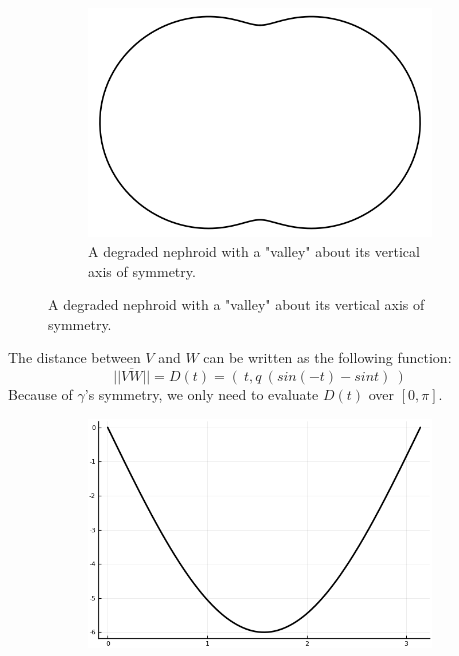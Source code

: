 \documentclass[12pt]{article}
\begin{document}
\begin{figure}[h!]
  \centering
      \begin{subfigure}[b]{0.5\linewidth}
    \includegraphics[width=\linewidth]{./assets/3-3-1/nephroid-degraded.png}
    \caption*{A degraded nephroid with a "valley" about its vertical axis of symmetry.}
  \end{subfigure}
  \end{figure}

\clearpage
The distance between $V$ and $W$ can be written as the following function:\\
$$
||\overline{VW}|| = D(t) = ( \ t, q \ (sin(-t) - sint) \ )
$$
Because of $\gamma$'s symmetry, we only need to evaluate $D(t)$ over $[0, \pi]$.
\begin{figure}[h!]
  \centering
      \begin{subfigure}[b]{0.7\linewidth}
    \includegraphics[width=\linewidth]{./assets/3-3-1/ellipse-chord-distance.png}
  \end{subfigure}
  \end{figure}
\end{document}
